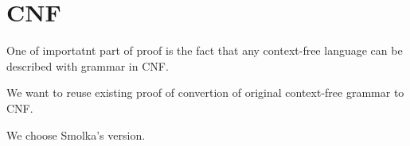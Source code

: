 \section{CNF}

One of importatnt part of proof is the fact that any context-free language can be described with grammar in CNF.

We want to reuse existing proof of convertion of original context-free grammar to CNF.

We choose Smolka's version.


